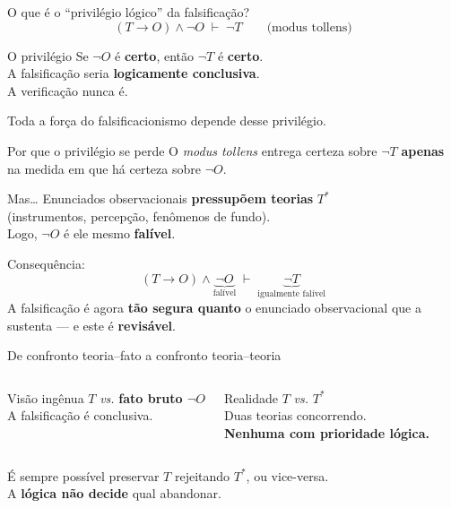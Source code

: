 \documentclass[aspectratio=169]{beamer}
\newcommand{\impt}[1]{\textcolor{maccent}{\textbf{#1}}}
\newcommand{\ntc}[1]{\textcolor{mprimary}{#1}}
\begin{document}
\begin{frame}{O que é o ``privilégio lógico'' da falsificação?}
\vspace{0.3cm}
\[
(T \rightarrow O) \wedge \neg O \;\vdash\; \neg T \qquad \text{(modus tollens)}
\]
\pause
\vspace{0.3cm}
\begin{block}{O privilégio}
Se $\neg O$ é \impt{certo}, então $\neg T$ é \impt{certo}. \\
A falsificação seria \impt{logicamente conclusiva}. \\
A verificação nunca é.
\end{block}
\pause
\vspace{0.4cm}
\ntc{Toda a força do falsificacionismo} depende desse privilégio.
\end{frame}

\begin{frame}{Por que o privilégio se perde}
O \emph{modus tollens} entrega certeza sobre $\neg T$ \impt{apenas} na medida em que há certeza sobre $\neg O$.
\pause
\vspace{0.4cm}
\begin{alertblock}{Mas\ldots}
Enunciados observacionais \impt{pressupõem teorias} $T^*$ \\
(instrumentos, percepção, fenômenos de fundo).\\[0.2cm]
Logo, $\neg O$ é ele mesmo \impt{falível}.
\end{alertblock}
\pause
\vspace{0.4cm}
\ntc{Consequência:}
\[
(T \rightarrow O) \wedge \underbrace{\neg O}_{\text{falível}} \;\vdash\; \underbrace{\neg T}_{\text{igualmente falível}}
\]
\pause
\vspace{0.2cm}
A falsificação é agora \impt{tão segura quanto} o enunciado observacional que a sustenta --- e este é \impt{revisável}.
\end{frame}

\begin{frame}{De confronto teoria--fato a confronto teoria--teoria}
\begin{columns}[t]
\begin{block}{Visão ingênua}
$T$ \emph{vs.} \impt{fato bruto $\neg O$} \\[0.2cm]
A falsificação é conclusiva.
\end{block}

\pause
\begin{alertblock}{Realidade}
$T$ \emph{vs.} $T^*$ \\[0.2cm]
Duas teorias concorrendo. \\
\impt{Nenhuma com prioridade lógica.}
\end{alertblock}
\end{columns}
\pause
\vspace{0.5cm}
\ntc{É sempre possível} preservar $T$ rejeitando $T^*$, ou vice-versa. \\
A \impt{lógica não decide} qual abandonar.
\end{frame}
\end{document}
